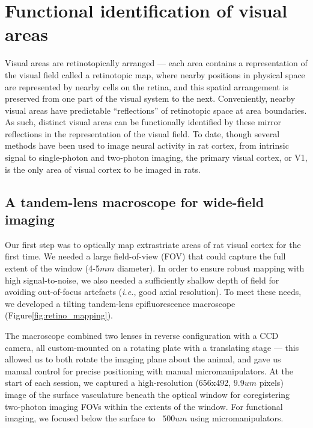 \section{Functional identification of visual areas}
Visual areas are retinotopically arranged --- each area contains a representation of the visual field called a retinotopic map, where nearby positions in physical space are represented by nearby cells on the retina, and this spatial arrangement is preserved from one part of the visual system to the next\cite{REFREF}. Conveniently, nearby visual areas have predictable ``reflections'' of retinotopic space at area boundaries. As such, distinct visual areas can be functionally identified by these mirror reflections in the representation of the visual field. To date, though several methods have been used to image neural activity in rat cortex, from intrinsic signal\cite{Gias2004} to single-photon \cite{Scott2018ImagingMacroscope} and two-photon \cite{Ohki2005, Greenberg2008} imaging, the primary visual cortex, or V1, is the only area of visual cortex to be imaged in rats.

\subsection{A tandem-lens macroscope for wide-field imaging}
Our first step was to optically map extrastriate areas of rat visual cortex for the first time. We needed a large field-of-view (FOV) that could capture the full extent of the window (4-5$mm$ diameter). In order to ensure robust mapping with high signal-to-noise, we also needed a sufficiently shallow depth of field for avoiding out-of-focus artefacts (\textit{i.e.}, good axial resolution). To meet these needs, we developed a tilting tandem-lens epifluorescence macroscope\cite{Ratzlaff1991} (Figure\ref{fig:retino_mapping}). 

The macroscope combined two lenses in reverse configuration with a CCD camera, all custom-mounted on a rotating plate with a translating stage --- this allowed us to both rotate the imaging plane about the animal, and gave us manual control for precise positioning with manual micromanipulators. At the start of each session, we captured a high-resolution (656x492, $9.9um$ pixels) image of the surface vasculature beneath the optical window for coregistering two-photon imaging FOVs within the extents of the window. For functional imaging, we focused below the surface to ~$500um$ using micromanipulators.

